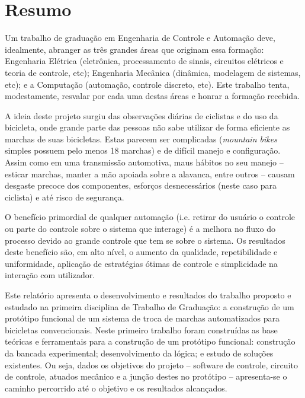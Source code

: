 \documentclass[a4paper,11pt]{article}
\begin{document}



%
\section{Resumo}
\label{sec:resumo}
Um trabalho de graduação em Engenharia de Controle e Automação deve,
idealmente, abranger as três grandes áreas que originam essa
formação\cite{enciclo}: Engenharia Elétrica (eletrônica, processamento de
sinais, circuitos elétricos e teoria de controle, etc); Engenharia
Mecânica (dinâmica, modelagem de sistemas, etc); e a Computação (automação,
controle discreto, etc). Este trabalho tenta, modestamente, resvalar por cada
uma destas áreas e honrar a formação recebida.

A ideia deste projeto surgiu das observações diárias de ciclistas e do
uso da bicicleta, onde grande parte das pessoas não sabe utilizar de
forma eficiente as marchas de suas bicicletas. Estas parecem ser
complicadas (\textit{mountain bikes} simples possuem pelo menos 18 marchas) e de
difícil manejo e configuração. Assim como em uma transmissão automotiva, maus
hábitos no seu manejo -- esticar marchas, manter a mão apoiada sobre a alavanca,
entre outros -- causam desgaste precoce dos componentes, esforços desnecessários
(neste caso para ciclista) e até risco de segurança.

O benefício primordial de qualquer automação (i.e. retirar do usuário o
controle ou parte do controle sobre o sistema que interage) é a melhora no
fluxo do processo devido ao grande controle que tem se sobre o sistema. Os
resultados deste benefício são, em alto nível, o aumento da qualidade,
repetibilidade e uniformidade, aplicação de estratégias ótimas de controle e
simplicidade na interação com utilizador.

Este relatório apresenta o desenvolvimento e resultados do trabalho proposto e
estudado na primeira disciplina de Trabalho de Graduação: a construção de um
protótipo funcional de um sistema de troca de marchas automatizados para
bicicletas convencionais. Neste primeiro trabalho foram construídas as base
teóricas e ferramentais para a construção de um protótipo funcional: construção
da bancada experimental; desenvolvimento da lógica; e estudo de soluções 
existentes. Ou seja, dados os objetivos do projeto -- software de controle,
circuito de controle, atuados mecânico e a junção destes no protótipo --
apresenta-se o caminho percorrido até o objetivo e os resultados alcançados.
\end{document}
